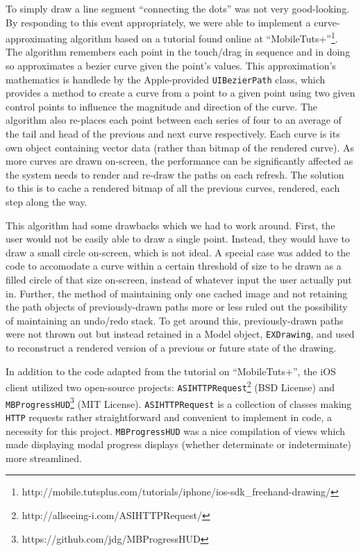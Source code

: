 \documentclass{acm_proc_article-sp}
\begin{document}
To simply draw a line segment ``connecting the dots'' was not very good-looking. By responding to this event appropriately, we were able to implement a curve-approximating algorithm based on a tutorial found online at ``MobileTuts+''\footnote{http://mobile.tutsplus.com/tutorials/iphone/ios-sdk\_freehand-drawing/}. The algorithm remembers each point in the touch/drag in sequence and in doing so approximates a bezier curve given the point's values. This approximation's mathematics is handlede by the Apple-provided \texttt{UIBezierPath} class, which provides a method to create a curve from a point to a given point using two given control points to influence the magnitude and direction of the curve. The algorithm also re-places each point between each series of four to an average of the tail and head of the previous and next curve respectively. Each curve is its own object containing vector data (rather than bitmap of the rendered curve). As more curves are drawn on-screen, the performance can be significantly affected as the system needs to render and re-draw the paths on each refresh. The solution to this is to cache a rendered bitmap of all the previous curves, rendered, each step along the way. 

This algorithm had some drawbacks which we had to work around. First, the user would not be easily able to draw a single point. Instead, they would have to draw a small circle on-screen, which is not ideal. A special case was added to the code to accomodate a curve within a certain threshold of size to be drawn as a filled circle of that size on-screen, instead of whatever input the user actually put in. Further, the method of maintaining only one cached image and not retaining the path objects of previously-drawn paths more or less ruled out the possibility of maintaining an undo/redo stack. To get around this, previously-drawn paths were not thrown out but instead retained in a Model object, \texttt{EXDrawing}, and used to reconstruct a rendered version of a previous or future state of the drawing.

In addition to the code adapted from the tutorial on ``MobileTuts+'', the iOS client utilized two open-source projects: \texttt{ASIHTTPRequest}\footnote{http://allseeing-i.com/ASIHTTPRequest/} (BSD License) and \texttt{MBProgressHUD}\footnote{https://github.com/jdg/MBProgressHUD} (MIT License). \texttt{ASIHTTPRequest} is a collection of classes making \texttt{HTTP} requests rather straightforward and convenient to implement in code, a necessity for this project. \texttt{MBProgressHUD} was a nice compilation of views which made displaying modal progress displays (whether determinate or indeterminate) more streamlined.
\end{document}
